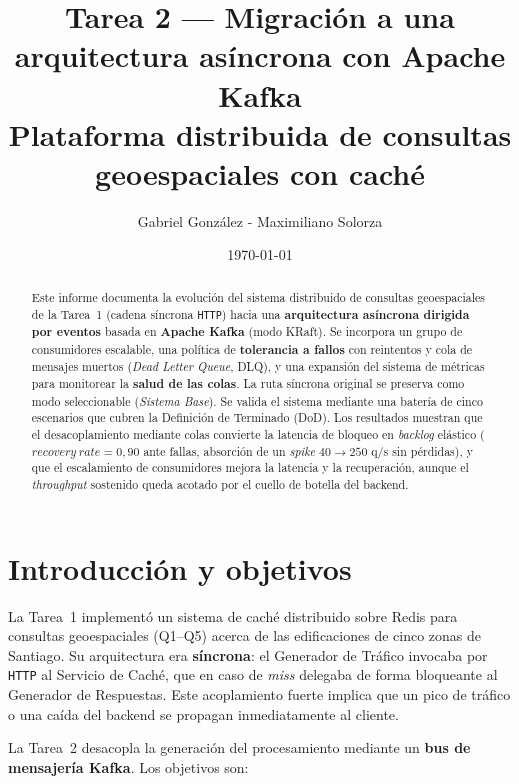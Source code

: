 \documentclass[11pt,a4paper]{article}
\title{\textbf{Tarea 2 --- Migración a una arquitectura asíncrona con Apache Kafka}\\[0.3em]
\large Plataforma distribuida de consultas geoespaciales con caché}
\author{Gabriel González - Maximiliano Solorza}
\date{\today}
\begin{document}
\maketitle

\newpage

\begin{abstract}
\noindent
Este informe documenta la evolución del sistema distribuido de consultas
geoespaciales de la Tarea~1 (cadena síncrona \texttt{HTTP}) hacia una
\textbf{arquitectura asíncrona dirigida por eventos} basada en
\textbf{Apache Kafka} (modo KRaft). Se incorpora un grupo de consumidores
escalable, una política de \textbf{tolerancia a fallos} con reintentos y cola
de mensajes muertos (\emph{Dead Letter Queue}, DLQ), y una expansión del
sistema de métricas para monitorear la \textbf{salud de las colas}. La ruta
síncrona original se preserva como modo seleccionable (\emph{Sistema Base}).
Se valida el sistema mediante una batería de cinco escenarios que cubren la
Definición de Terminado (DoD). Los resultados muestran que el desacoplamiento
mediante colas convierte la latencia de bloqueo en \emph{backlog} elástico
($recovery\ rate = 0{,}90$ ante fallas, absorción de un \emph{spike}
$40\to250$ q/s sin pérdidas), y que el escalamiento de consumidores mejora la
latencia y la recuperación, aunque el \emph{throughput} sostenido queda
acotado por el cuello de botella del backend.
\end{abstract}

\tableofcontents
\bigskip

\section{Introducción y objetivos}
La Tarea~1 implementó un sistema de caché distribuido sobre Redis para
consultas geoespaciales (Q1--Q5) acerca de las edificaciones de cinco zonas de
Santiago. Su arquitectura era \textbf{síncrona}: el Generador de Tráfico
invocaba por \texttt{HTTP} al Servicio de Caché, que en caso de \emph{miss}
delegaba de forma bloqueante al Generador de Respuestas. Este acoplamiento
fuerte implica que un pico de tráfico o una caída del backend se propagan
inmediatamente al cliente.

La Tarea~2 desacopla la generación del procesamiento mediante un
\textbf{bus de mensajería Kafka}. Los objetivos son:
\end{document}
